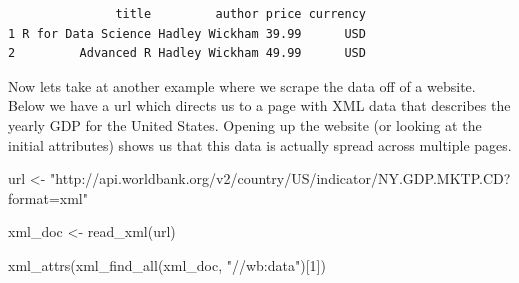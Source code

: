 \documentclass[
  letterpaper,
  DIV=11,
  numbers=noendperiod]{scrreprt}
\newenvironment{Shaded}{\begin{snugshade}}{\end{snugshade}}
\newcommand{\DecValTok}[1]{\textcolor[rgb]{0.68,0.00,0.00}{#1}}
\newcommand{\FunctionTok}[1]{\textcolor[rgb]{0.28,0.35,0.67}{#1}}
\newcommand{\NormalTok}[1]{\textcolor[rgb]{0.00,0.23,0.31}{#1}}
\newcommand{\OtherTok}[1]{\textcolor[rgb]{0.00,0.23,0.31}{#1}}
\newcommand{\StringTok}[1]{\textcolor[rgb]{0.13,0.47,0.30}{#1}}
\begin{document}
\begin{verbatim}
               title         author price currency
1 R for Data Science Hadley Wickham 39.99      USD
2         Advanced R Hadley Wickham 49.99      USD
\end{verbatim}

Now lets take at another example where we scrape the data off of a
website. Below we have a url which directs us to a page with XML data
that describes the yearly GDP for the United States. Opening up the
website (or looking at the initial attributes) shows us that this data
is actually spread across multiple pages.

\begin{Shaded}
\begin{Highlighting}[]
\NormalTok{url }\OtherTok{\textless{}{-}} \StringTok{"http://api.worldbank.org/v2/country/US/indicator/NY.GDP.MKTP.CD?format=xml"}
\end{Highlighting}
\end{Shaded}

\begin{Shaded}
\end{Shaded}

\begin{Shaded}
\begin{Highlighting}[]
\NormalTok{xml\_doc }\OtherTok{\textless{}{-}} \FunctionTok{read\_xml}\NormalTok{(url)}

\FunctionTok{xml\_attrs}\NormalTok{(}\FunctionTok{xml\_find\_all}\NormalTok{(xml\_doc, }\StringTok{"//wb:data"}\NormalTok{)[}\DecValTok{1}\NormalTok{])}
\end{Highlighting}
\end{Shaded}
\end{document}
